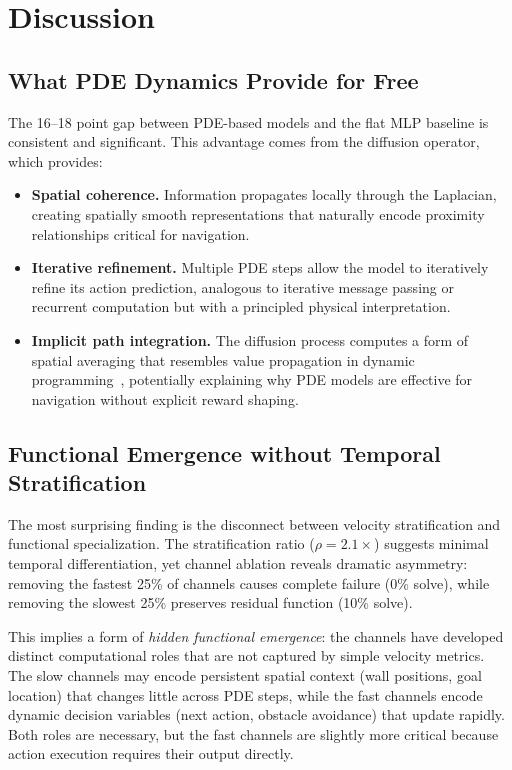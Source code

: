 \documentclass{article}
\begin{document}
\section{Discussion}
\label{sec:discussion}

\subsection{What PDE Dynamics Provide for Free}

The 16--18 point gap between PDE-based models and the flat MLP baseline is consistent and significant. This advantage comes from the diffusion operator, which provides:

\begin{itemize}
    \item \textbf{Spatial coherence.} Information propagates locally through the Laplacian, creating spatially smooth representations that naturally encode proximity relationships critical for navigation.
    \item \textbf{Iterative refinement.} Multiple PDE steps allow the model to iteratively refine its action prediction, analogous to iterative message passing or recurrent computation but with a principled physical interpretation.
    \item \textbf{Implicit path integration.} The diffusion process computes a form of spatial averaging that resembles value propagation in dynamic programming~\cite{watkins1992qlearning}, potentially explaining why PDE models are effective for navigation without explicit reward shaping.
\end{itemize}

\subsection{Functional Emergence without Temporal Stratification}

The most surprising finding is the disconnect between velocity stratification and functional specialization. The stratification ratio ($\rho = 2.1\times$) suggests minimal temporal differentiation, yet channel ablation reveals dramatic asymmetry: removing the fastest 25\% of channels causes complete failure (0\% solve), while removing the slowest 25\% preserves residual function (10\% solve).

This implies a form of \emph{hidden functional emergence}: the channels have developed distinct computational roles that are not captured by simple velocity metrics. The slow channels may encode persistent spatial context (wall positions, goal location) that changes little across PDE steps, while the fast channels encode dynamic decision variables (next action, obstacle avoidance) that update rapidly. Both roles are necessary, but the fast channels are slightly more critical because action execution requires their output directly.
\end{document}
